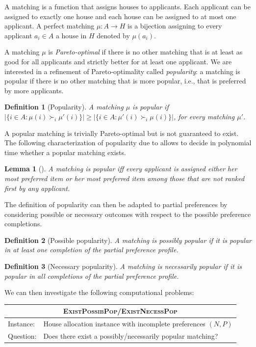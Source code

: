 \documentclass{article}
\newcommand{\agents}{A}
\newcommand{\objects}{H}
\newcommand{\match}{\mu}
\newtheorem{definition}{Definition}
\newtheorem{lemma}{Lemma}
\begin{document}
A matching is a function that assigns houses to applicants. 
Each applicant can be assigned to exactly one house and each house can be assigned to at most one applicant. 
A perfect matching $\match:\agents\to \objects$ is a bijection assigning to every applicant $a_i\in \agents$ a house in $\objects$ denoted by $\match(a_i)$.

A matching $\match$ is \emph{Pareto-optimal} if there is no other matching that is at least as good for all applicants and strictly better for at least one applicant.
We are interested in a refinement of Pareto-optimality called \emph{popularity}: a matching is popular if there is no other matching that is more popular, i.e., that is preferred by more applicants.

\begin{definition}[Popularity]
A matching $\match$ is popular if $|\{i\in \agents: \match(i)\succ_i \match'(i)\}|\geq |\{i\in \agents: \match'(i)\succ_i \match(i)\}|$, for every matching $\match'$.
\end{definition}

A popular matching is trivially Pareto-optimal but is not guaranteed to exist.
The following characterization of popularity due to \citet{abraham2007popular} allows to decide in polynomial time whether a popular matching exists.

\begin{lemma}[\citet{abraham2007popular}]\label{lem:charact-pop}
A matching is popular iff every applicant is assigned either her most preferred item or her most preferred item among those that are not ranked first by any applicant.
\end{lemma}

The definition of popularity can then be adapted to partial preferences by considering possible or necessary outcomes with respect to the possible preference completions.

\begin{definition}[Possible popularity]
A matching is possibly popular if it is popular in at least one completion of the partial preference profile.
\end{definition}

\begin{definition}[Necessary popularity]
A matching is necessarily popular if it is popular in all completions of the partial preference profile. 
\end{definition}

We can then investigate the following computational problems:
\smallbreak
\begin{tabular}{ll}
\toprule
\multicolumn{2}{c}{\textsc{ExistPossibPop}/\textsc{ExistNecessPop}} \\
\midrule
Instance: & House allocation instance with incomplete preferences $(N,P)$ \\
Question: & Does there exist a possibly/necessarily popular matching? \\
\bottomrule
\end{tabular}
\end{document}
